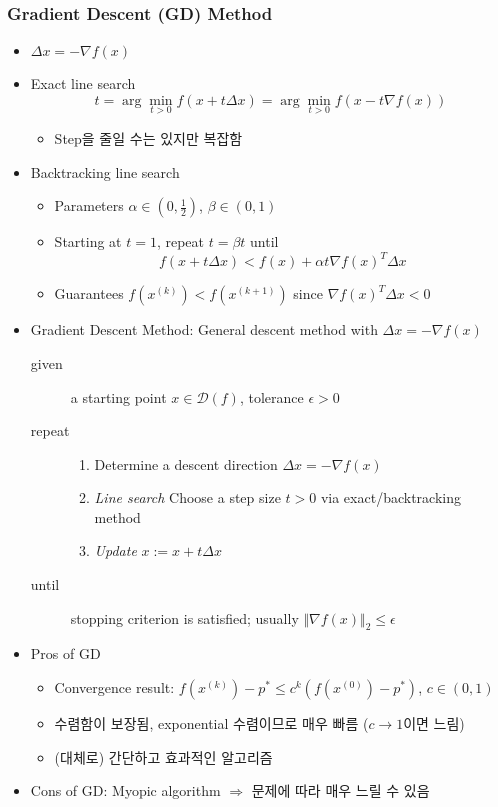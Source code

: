 \subsubsection*{Gradient Descent (GD) Method}
\begin{itemize}
    \item $\Delta x = -\nabla f(x)$
    \item Exact line search
        $$t = \arg\min_{t>0}f(x+t\Delta x) = \arg\min_{t>0}f(x-t\nabla f(x))$$
    \begin{itemize}
        \item Step을 줄일 수는 있지만 복잡함
    \end{itemize}
    \item Backtracking line search
    \begin{itemize}
        \item Parameters $\alpha\in\left(0,\frac{1}{2}\right)$, $\beta\in(0,1)$
        \item Starting at $t=1$, repeat $t=\beta t$ until
            $$ f(x+t\Delta x) < f(x)+\alpha t\nabla f(x)^T\Delta x $$
        \item Guarantees $f(x^{(k)})<f(x^{(k+1)})$ since $\nabla f(x)^T\Delta x<0$
    \end{itemize}
    \item Gradient Descent Method: General descent method with $\Delta x = -\nabla f(x)$
    \begin{description}
        \item[given] a starting point $x\in\mathcal{D}(f)$, tolerance $\epsilon>0$
        \item[repeat] \phantom{}
        \begin{enumerate}
            \item Determine a descent direction $\Delta x=-\nabla f(x)$
            \item \textit{Line search} Choose a step size $t>0$ via exact/backtracking method
            \item \textit{Update} $x:=x+t\Delta x$
        \end{enumerate}
        \item[until] stopping criterion is satisfied; usually $\Vert\nabla f(x)\Vert_2\leq\epsilon$
    \end{description}
    \item Pros of GD
    \begin{itemize}
        \item Convergence result: $f(x^{(k)})-p^\ast\leq c^k\left(f(x^{(0)})-p^\ast\right)$, $c\in(0,1)$
        \item 수렴함이 보장됨, exponential 수렴이므로 매우 빠름 ($c\rightarrow 1$이면 느림)
        \item (대체로) 간단하고 효과적인 알고리즘
    \end{itemize}
    \item Cons of GD: Myopic algorithm $\Rightarrow$ 문제에 따라 매우 느릴 수 있음
\end{itemize}

